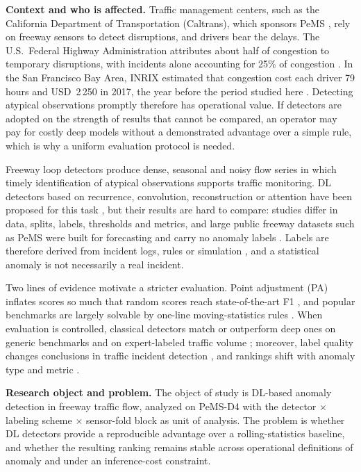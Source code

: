 \documentclass[conference]{IEEEtran}
\begin{document}
\textbf{Context and who is affected.} Traffic management centers, such as the
California Department of Transportation (Caltrans), which sponsors PeMS
\cite{chen2003pems}, rely on freeway sensors to detect disruptions, and
drivers bear the delays. The U.S.\ Federal Highway Administration attributes
about half of congestion to temporary disruptions, with incidents alone
accounting for 25\% of congestion \cite{fhwa_nonrecurring}. In the San
Francisco Bay Area, INRIX estimated that congestion cost each driver 79 hours
and USD~2\,250 in 2017, the year before the period studied here
\cite{cbs2018inrix}. Detecting atypical observations promptly therefore has
operational value. If detectors are adopted on the strength of results that
cannot be compared, an operator may pay for costly deep models without a
demonstrated advantage over a simple rule, which is why a uniform evaluation
protocol is needed.

Freeway loop detectors produce dense, seasonal and noisy flow series in
which timely identification of atypical observations supports traffic
monitoring. DL detectors based on recurrence, convolution, reconstruction or
attention have been proposed for this task
\cite{zhang2022automatic,mendez2022using,ijaradar2025datadriven,nouri2025sidmseq},
but their results are hard to compare: studies differ in data, splits,
labels, thresholds and metrics, and large public freeway datasets such as
PeMS were built for forecasting and carry no anomaly labels
\cite{coursey2024ftaed}. Labels are therefore derived from incident logs,
rules or simulation \cite{sun2022datacentric,yang2025sumo}, and a statistical
anomaly is not necessarily a real incident.

Two lines of evidence motivate a stricter evaluation. Point adjustment (PA)
inflates scores so much that random scores reach state-of-the-art F1
\cite{kim2022rigorous}, and popular benchmarks are largely solvable by
one-line moving-statistics rules \cite{wu2022flawed}. When evaluation is
controlled, classical detectors match or outperform deep ones on generic
benchmarks
\cite{schmidl2022anomaly,audibert2022deep,rewicki2023worth,liu2024elephant}
and on expert-labeled traffic volume \cite{taheri2026applicability};
moreover, label quality changes conclusions in traffic incident detection
\cite{sun2022datacentric}, and rankings shift with anomaly type and metric
\cite{liu2024elephant,sorbo2024navigating}.

\textbf{Research object and problem.} The object of study is DL-based
anomaly detection in freeway traffic flow, analyzed on PeMS-D4 with the
detector $\times$ labeling scheme $\times$ sensor-fold block as unit of
analysis. The problem is whether DL detectors provide a reproducible
advantage over a rolling-statistics baseline, and whether the resulting
ranking remains stable across operational definitions of anomaly and under
an inference-cost constraint.
\end{document}

